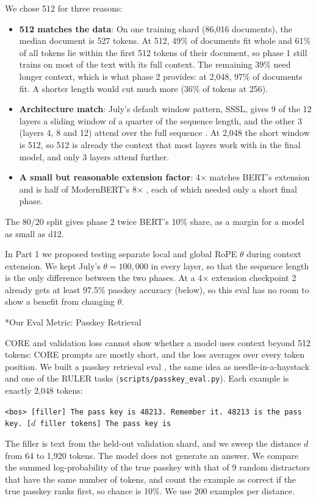 \documentclass[11pt]{article}
\makeatletter
\renewcommand\subsection{\@startsection{subsection}{2}{\z@}{0.6em}{0.2em}{\normalsize\bfseries}}
\newcommand{\code}[1]{\texttt{#1}}
\makeatother
\begin{document}
We chose 512 for three reasons:
\begin{itemize}
  \item \textbf{512 matches the data}: On one training shard (86,016 documents), the median document is 527 tokens. At 512, 49\% of documents fit whole and 61\% of all tokens lie within the first 512 tokens of their document, so phase 1 still trains on most of the text with its full context. The remaining 39\% need longer context, which is what phase 2 provides: at 2,048, 97\% of documents fit. A shorter length would cut much more (36\% of tokens at 256).
  \item \textbf{Architecture match}: July's default window pattern, SSSL, gives 9 of the 12 layers a sliding window of a quarter of the sequence length, and the other 3 (layers 4, 8 and 12) attend over the full sequence \cite{nanochat}. At 2,048 the short window is 512, so 512 is already the context that most layers work with in the final model, and only 3 layers attend further.
  \item \textbf{A small but reasonable extension factor}: 4$\times$ matches BERT's extension and is half of ModernBERT's 8$\times$ \cite{modernbert}, each of which needed only a short final phase.
\end{itemize}
The 80/20 split gives phase 2 twice BERT's 10\% share, as a margin for a model as small as d12.

In Part 1 we proposed testing separate local and global RoPE $\theta$ during context extension. We kept July's $\theta = 100{,}000$ in every layer, so that the sequence length is the only difference between the two phases. At a 4$\times$ extension checkpoint 2 already gets at least 97.5\% passkey accuracy (below), so this eval has no room to show a benefit from changing $\theta$.

\subsection*{Our Eval Metric: Passkey Retrieval}

CORE and validation loss cannot show whether a model uses context beyond 512 tokens: CORE prompts are mostly short, and the loss averages over every token position. We built a passkey retrieval eval \cite{landmark}, the same idea as needle-in-a-haystack \cite{niah} and one of the RULER tasks \cite{ruler} (\code{scripts/passkey\_eval.py}). Each example is exactly 2,048 tokens:
\begin{center}
\small\texttt{<bos> [filler] The pass key is 48213. Remember it. 48213 is the pass key. [$d$ filler tokens] The pass key is}
\end{center}
The filler is text from the held-out validation shard, and we sweep the distance $d$ from 64 to 1,920 tokens. The model does not generate an answer. We compare the summed log-probability of the true passkey with that of 9 random distractors that have the same number of tokens, and count the example as correct if the true passkey ranks first, so chance is 10\%. We use 200 examples per distance.
\end{document}
